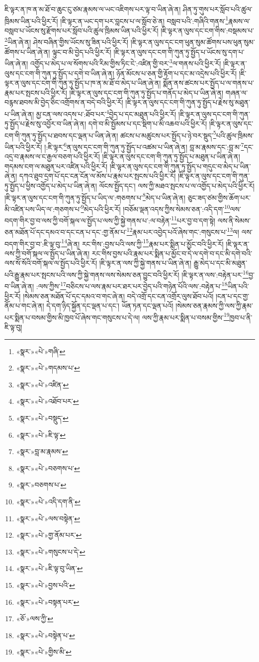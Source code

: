 ཇི་ལྟར་ན་ཁ་ན་མ་ཐོ་བ་ཆུང་ངུ་ཙམ་རྣམས་ལ་ཡང་འཇིགས་པར་ལྟ་བ་ཡིན་ཞེ་ན། ཤིན་ཏུ་གུས་པར་སློབ་པའི་ཚུལ་ཁྲིམས་ཡིན་པའི་ཕྱིར་རོ། །ཇི་ལྟར་ན་ཡང་དག་པར་བླངས་པ་ལ་སློབ་ཅེ་ན། བསླབ་པའི་:གཞིའི་གནས་\footnote{«སྣར་»«པེ་»གཞི་}རྣམས་ལ་བསླབ་པ་ཡོངས་སུ་རྫོགས་པར་སློབ་པའི་ཚུལ་ཁྲིམས་ཡིན་པའི་ཕྱིར་རོ། །ཇི་ལྟར་ན་ལུས་དང་ངག་གིས་:བསྡམས་པ་\footnote{«སྣར་»«པེ་»གདམས་པ་}ཡིན་ཞེ་ན། ཤེས་བཞིན་གྱིས་ཡོངས་སུ་ཟིན་པའི་ཕྱིར་རོ། །ཇི་ལྟར་ན་ལུས་དང་ངག་ཕུན་སུམ་ཚོགས་པས་ཕུན་སུམ་ཚོགས་པ་ཡིན་ཞེ་ན། ལྟུང་བ་མི་བྱེད་པའི་ཕྱིར་རོ། །ཇི་ལྟར་ན་ལུས་དང་ངག་གི་ཀུན་ཏུ་སྤྱོད་པ་ཡོངས་སུ་དག་པ་ཡིན་ཞེ་ན། འགྱོད་པ་མེད་པ་ལ་སོགས་པའི་རིམ་གྱིས་ཏིང་ངེ་:འཛིན་གྱི་བར་\footnote{«སྣར་»«པེ་»འཛིན་}ལ་གནས་པའི་ཕྱིར་རོ། །ཇི་ལྟར་ན་ལུས་དང་ངག་གི་ཀུན་ཏུ་སྤྱོད་པ་དགེ་བ་ཡིན་ཞེ་ན། ཉོན་མོངས་པ་ཅན་གྱི་རྟོག་པ་དང་མ་འདྲེས་པའི་ཕྱིར་རོ། །ཇི་ལྟར་ན་ལུས་དང་ངག་གི་ཀུན་ཏུ་སྤྱོད་པ་ཁ་ན་མ་ཐོ་བ་མེད་པ་ཡིན་ཞེ་ན། སྨོན་ནས་ཚངས་པར་སྤྱོད་པ་ལ་གནས་པ་རྣམ་པར་སྤངས་པའི་ཕྱིར་རོ། །ཇི་ལྟར་ན་ལུས་དང་ངག་གི་ཀུན་ཏུ་སྤྱོད་པ་གནོད་པ་མེད་པ་ཡིན་ཞེ་ན། གཞན་ལ་བརྙས་ཐབས་མི་བྱེད་ཅིང་འགྲོགས་ན་བདེ་བའི་ཕྱིར་རོ། །ཇི་ལྟར་ན་ལུས་དང་ངག་གི་ཀུན་ཏུ་སྤྱོད་པ་རྗེས་སུ་མཐུན་པ་ཡིན་ཞེ་ན། མྱ་ངན་ལས་འདས་པ་:ཐོབ་པར་\footnote{«སྣར་»«པེ་»འཐོབ་པར་}བྱེད་པ་དང་མཐུན་པའི་ཕྱིར་རོ། །ཇི་ལྟར་ན་ལུས་དང་ངག་གི་ཀུན་ཏུ་སྤྱོད་པ་རྗེས་སུ་འབྱོར་བ་ཡིན་ཞེ་ན། དགེ་བ་མི་སྤྱོམས་པ་དང་སྡིག་པ་མི་འཆབ་པའི་ཕྱིར་རོ། །ཇི་ལྟར་ན་ལུས་དང་ངག་གི་ཀུན་ཏུ་སྤྱོད་པ་ཐབས་དང་ལྡན་པ་ཡིན་ཞེ་ན། ཚངས་པ་མཚུངས་པར་སྤྱོད་པ་ཉེ་བར་སྡུད་\footnote{«སྣར་»«པེ་»བསྡུད་}པའི་ཚུལ་ཁྲིམས་ཡིན་པའི་ཕྱིར་རོ། །:ཇི་ལྟར་\footnote{«སྣར་»«པེ་»ཇི་ལྟ་}ན་ལུས་དང་ངག་གི་ཀུན་ཏུ་སྤྱོད་པ་འཚམ་པ་ཡིན་ཞེ་ན། བླ་མ་རྣམས་དང་:བླ་མ་\footnote{«སྣར་»བླ་མ་རྣམས་}དང་འདྲ་བ་རྣམས་ལ་ང་རྒྱལ་བཅག་པའི་ཕྱིར་རོ། །ཇི་ལྟར་ན་ལུས་དང་ངག་གི་ཀུན་ཏུ་སྤྱོད་པ་མཐུན་པ་ཡིན་ཞེ་ན། གདམས་ངག་ལ་མཐུན་པར་འཛིན་པའི་ཕྱིར་རོ། །ཇི་ལྟར་ན་ལུས་དང་ངག་གི་ཀུན་ཏུ་སྤྱོད་པ་གདུང་བ་མེད་པ་ཡིན་ཞེ་ན། དཀའ་ཐུབ་དྲག་པོ་དང་ངན་ངོན་ལ་མོས་པ་རྣམ་པར་སྤངས་པའི་ཕྱིར་རོ། །ཇི་ལྟར་ན་ལུས་དང་ངག་གི་ཀུན་ཏུ་སྤྱོད་པ་ཕྱིས་འགྱོད་པ་མེད་པ་ཡིན་ཞེ་ན། ལོངས་སྤྱོད་དང་། ལས་ཀྱི་མཐའ་སྤངས་པ་ལ་འགྱོད་པ་མེད་པའི་ཕྱིར་རོ། །ཇི་ལྟར་ན་ལུས་དང་ངག་གི་ཀུན་ཏུ་སྤྱོད་པ་ཡིད་ལ་:གཅགས་པ་\footnote{«སྣར་»«པེ་»བཅགས་པ་}མེད་པ་ཡིན་ཞེ་ན། ཅུང་ཟད་ཙམ་གྱིས་ཆོག་པར་མི་འཛིན་པས་ཡིད་ལ་:གཅགས་པ་\footnote{«སྣར་»བཅགས་པ་}མེད་པའི་ཕྱིར་རོ། །བཅོམ་ལྡན་འདས་ཀྱིས་སེམས་ཅན་:འདི་དག་\footnote{«སྣར་»«པེ་»འདི་དག་ནི་}ལས་བདག་གིར་བྱ་བ་ལས་ཀྱི་བགོ་སྐལ་ལ་སྤྱོད་པ་ལས་ཀྱི་སྐྱེ་གནས་པ་:ལ་བརྟེན་\footnote{«སྣར་»«པེ་»ལས་བསྟེན་}པར་བྱ་བ་དག་སྟེ། ལས་ནི་སེམས་ཅན་མཐོན་པོ་དང་དམའ་བ་དང་ངན་པ་དང་:གྱ་ནོམ་པ་\footnote{«སྣར་»«པེ་»གྱ་ནོམ་པར་}རྣམ་པར་འབྱེད་པའོ་ཞེས་གང་:གསུངས་པ་\footnote{«སྣར་»«པེ་»གསུངས་པ་དེ་}ལ། ལས་བདག་གིར་བྱ་བ་:ཇི་ལྟ་བུ་\footnote{«སྣར་»«པེ་»ཇི་ལྟ་བུ་ཡིན་}ཞེ་ན། རང་གིས་:བྱས་པའི་ལས་ཀྱི་\footnote{«སྣར་»«པེ་»བྱས་པའི་}རྣམ་པར་སྨིན་པ་མྱོང་བའི་ཕྱིར་རོ། །ཇི་ལྟར་ན་ལས་ཀྱི་བགོ་སྐལ་ལ་སྤྱོད་པ་ཡིན་ཞེ་ན། རང་གིས་བྱས་པའི་རྣམ་པར་སྨིན་པ་མྱོང་བ་དེ་ལ་དགེ་བ་དང་མི་དགེ་བའི་ལས་སོ་སོའི་བགོ་སྐལ་ལ་སྤྱོད་པའི་ཕྱིར་རོ། །ཇི་ལྟར་ན་ལས་ཀྱི་སྐྱེ་གནས་པ་ཡིན་ཞེ་ན། རྒྱུ་མེད་པ་དང་མི་མཐུན་པའི་རྒྱུ་རྣམ་པར་སྤངས་པའི་ལས་ཀྱི་སྐྱེ་གནས་ལས་སེམས་ཅན་བྱུང་བའི་ཕྱིར་རོ། །ཇི་ལྟར་ན་ལས་:བརྟེན་པར་\footnote{«སྣར་»«པེ་»བསྟན་པར་}བྱ་བ་ཡིན་ཞེ་ན། :ལས་ཀྱིས་\footnote{«ཅོ་»ལས་ཀྱི་}བཅིངས་པ་ལས་རྣམ་པར་ཐར་པར་བྱེད་པའི་གཉེན་པོའི་ལས་:བརྟེན་པ་\footnote{«སྣར་»«པེ་»བསྟེན་པ་}ཡིན་པའི་ཕྱིར་རོ། །སེམས་ཅན་མཐོན་པོ་དང་དམའ་བ་གང་ཞེ་ན། བདེ་འགྲོ་དང་ངན་འགྲོར་ལུས་ཐོབ་པའོ། །ངན་པ་དང་གྱ་ནོམ་པ་གང་ཞེ་ན། དེ་དག་ཉིད་སྐྱོན་དང་ལྡན་པ་དང་། ཡོན་ཏན་དང་ལྡན་པའོ། །སེམས་ཅན་རྣམས་ཀྱི་ལས་ཀྱི་རྣམ་པར་སྨིན་པ་བསམ་གྱིས་མི་ཁྱབ་པོ་ཞེས་གང་གསུངས་པ་དེ་ལ། ལས་ཀྱི་རྣམ་པར་སྨིན་པ་བསམ་གྱིས་\footnote{«སྣར་»«པེ་»གྱིས་མི་}ཁྱབ་པ་ནི་ཇི་ལྟ་བུ། 
